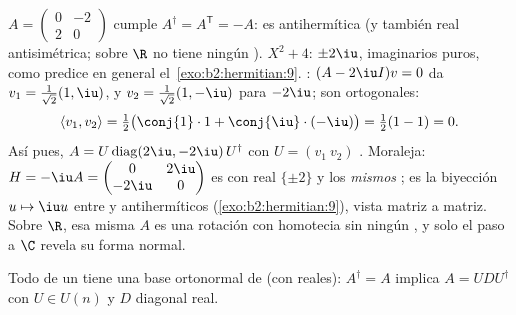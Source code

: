 \begin{example}\label{ex:b2:hermitian:skewexample}
$A = \begin{pmatrix} 0 & -2\\ 2 & 0\end{pmatrix}$ cumple $A^\dagger =
A^{\mathsf T} = -A$: es antihermítica (y también real antisimétrica;
sobre $\R$ no tiene ningún ). 
$X^2 + 4$:  $\pm2\iu$, imaginarios puros, como predice
en general el~\cref{exo:b2:hermitian:9}. : $(A - 2\iu
I)v = 0$ da $v_1 = \frac{1}{\sqrt2}(1, \iu)$, y $v_2 =
\frac{1}{\sqrt2}(1, -\iu)$ para $-2\iu$; son ortogonales:
\[
\langle v_1, v_2\rangle
= \tfrac12\bigl(\conj{1}\cdot1 +
\conj{\iu}\cdot(-\iu)\bigr)
= \tfrac12(1 - 1) = 0 .
\]
Así pues, $A = U\operatorname{diag}(2\iu, -2\iu)\,U^\dagger$ con $U =
(v_1\ v_2)$ . Moraleja: $H = -\iu A = \begin{pmatrix} 0 &
2\iu\\ -2\iu & 0\end{pmatrix}$ es  con  real
$\{\pm2\}$ y los \emph{mismos} ; es la biyección $u
\mapsto \iu u$ entre  y antihermíticos
(\cref{exo:b2:hermitian:9}), vista matriz a matriz. Sobre $\R$, esa
misma $A$ es una rotación con homotecia sin ningún , y
solo el paso a $\C$ revela su forma normal.
\end{example}

\begin{theorem}\label{thm:b2:hermitian:spectral}
Todo  de un  tiene una base
ortonormal de  (con  reales):
$A^\dagger = A$ implica $A = U D U^{\dagger}$ con $U \in U(n)$ y $D$
diagonal real.
\end{theorem}

